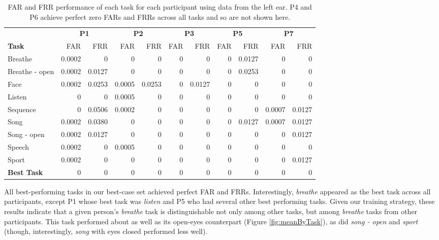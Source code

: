 \documentclass{sigchi}
\begin{document}
\begin{table}[t]
\centering
\begin{tabularx}{.85\textwidth}{lrrrrrrrrrr}
& \multicolumn{2}{c}{\textbf{P1}} & \multicolumn{2}{c}{\textbf{P2}} & \multicolumn{2}{c}{\textbf{P3}} & \multicolumn{2}{c}{\textbf{P5}} & \multicolumn{2}{c}{\textbf{P7}}\\
\textbf{Task} & FAR & FRR & FAR & FRR & FAR & FRR & FAR & FRR & FAR & FRR\\ \hline
Breathe & 0.0002 & 0 & 0 & 0 & 0 & 0 & 0 & 0.0127 & 0 & 0\\
Breathe - open & 0.0002 & 0.0127 & 0 & 0 & 0 & 0 & 0 & 0.0253 & 0 & 0\\
Face & 0.0002 & 0.0253 & 0.0005 & 0.0253 & 0 & 0.0127 & 0 & 0 & 0 & 0\\
Listen & 0 & 0 & 0.0005 & 0 & 0 & 0 & 0 & 0 & 0 & 0\\
Sequence & 0 & 0.0506 & 0.0002 & 0 & 0 & 0 & 0 & 0 & 0.0007 & 0.0127\\
Song	 & 0.0002 & 0.0380 & 0 & 0 & 0	 & 0 & 0 & 0.0127 & 0.0007 & 0.0127\\
Song - open & 0.0002 & 0.0127 & 0 & 0 & 0 & 0 & 0 & 0 & 0 & 0.0127\\
Speech & 0.0002 & 0 & 0.0005 & 0 & 0 & 0 & 0 & 0 & 0 & 0\\
Sport & 0.0002 & 0 & 0 & 0 & 0 & 0 & 0 & 0  & 0 & 0.0127\\
\textbf{Best Task} & 0 & 0 & 0 & 0 & 0 & 0 & 0 & 0 & 0 & 0\\ \hline
\end{tabularx}
\caption{FAR and FRR performance of each task for each participant using data from the left ear. P4 and P6 achieve perfect zero FARs and FRRs across all tasks and so are not shown here.}
\label{tab:farfrrall}
\end{table}

All best-performing tasks in our best-case set achieved perfect FAR and FRRs. Interestingly, \textit{breathe} appeared as the best task across all participants, except P1 whose best task was \textit{listen} and P5 who had several other best performing tasks. Given our training strategy, these results indicate that a given person's \textit{breathe} task is distinguishable not only among other tasks, but among \textit{breathe} tasks from other participants.
This task performed about as well as its open-eyes counterpart (Figure \ref{fig:meanByTask}), as did \textit{song - open} and \textit{sport} (though, interestingly, \textit{song} with eyes closed performed less well).
\end{document}
